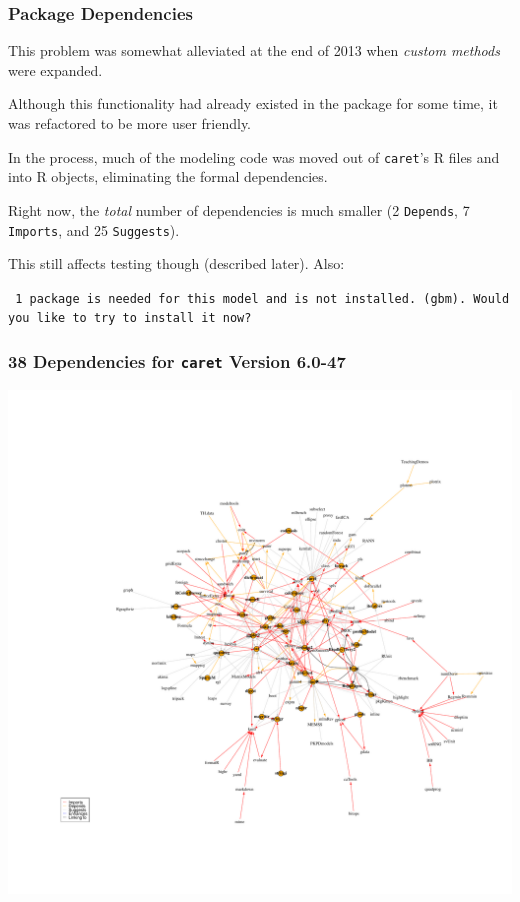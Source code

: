 \documentclass[12 pt]{beamer}\usepackage[]{graphicx}\usepackage[]{color}
\newcommand{\pkg}[1]{{\fontseries{b}\selectfont #1}}
\renewcommand{\pkg}[1]{{\color{darkgreen}\texttt{#1}}}
\begin{document}
\begin{frame}[fragile]
\frametitle{Package Dependencies}

This problem was somewhat alleviated at the end of 2013 when {\em custom methods} were expanded.

\vspace{.1in}

Although this functionality had already existed in the package for some time, it was refactored to be more user friendly.

\vspace{.1in}

In the process, much of the modeling code was moved out of \pkg{caret}'s R files and into R objects, eliminating the formal dependencies.

\vspace{.1in}

Right now, the {\em total} number of dependencies is much smaller (2 \texttt{Depends}, 7 \texttt{Imports}, and 25 \texttt{Suggests}).

\vspace{.1in}

This still affects testing though (described later). Also:

\vspace{.1in}

{\tt \color{darkblue} \footnotesize 1 package is needed for this model and is not installed. (gbm). Would you like to try to install it now?}

\end{frame}



  \begin{frame}[fragile]
\frametitle{38 Dependencies for \pkg{caret} Version 6.0-47 }
\vspace{-.5in}
  \begin{center}
    \includegraphics[clip, width = .85\textwidth]{new_graph}
  \end{center}

\end{frame}
\end{document}
